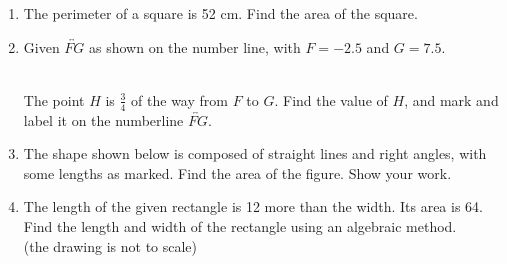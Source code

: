 \documentclass[12pt, twoside]{article}
\begin{document}
\begin{enumerate}
  \item The perimeter of a square is 52 cm. Find the area of the square.

\newpage
\item Given $\overleftrightarrow{FG}$ as shown on the number line, with $F=-2.5$ and $G=7.5$. \\[20pt] %
  \\[5pt]
  The point $H$ is $\frac{3}{4}$ of the way from $F$ to $G$. Find the value of $H$, and mark and label it on the numberline $\overleftrightarrow{FG}$. 
  \vspace{6cm}

  \item The shape shown below is composed of straight lines and right angles, with some lengths as marked. Find the area of the figure. Show your work.
  \begin{flushleft}
  \end{flushleft} \vspace{2cm}

\newpage

  \item The length of the given rectangle is 12 more than the width. Its area is 64. Find the length and width of the rectangle using an algebraic method.\\[5pt]
  (the drawing is not to scale)
  \begin{flushleft}
  \end{flushleft} \vspace{5cm}


\end{enumerate}
\end{document}
